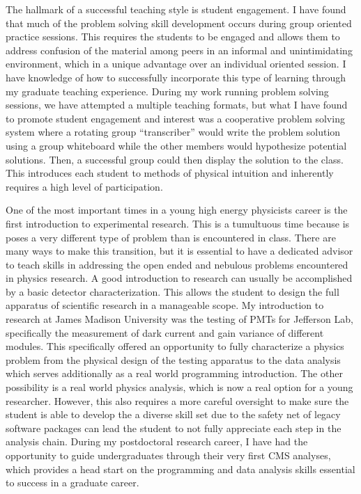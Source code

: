 \documentclass[12pt]{article}
\begin{document}
The hallmark of a successful teaching style is student engagement. I have found
that much of the problem solving skill development occurs during group oriented
practice sessions. This requires the students to be engaged and allows them to
address confusion of the material among peers in an informal and unintimidating
environment, which in a unique advantage over an individual oriented session. I
have knowledge of how to successfully incorporate this type of learning through
my graduate teaching experience. During my work running problem solving sessions,
we have attempted a multiple teaching formats, but what I have found to promote
student engagement and interest was a cooperative problem solving system where a
rotating group “transcriber” would write the problem solution using a group
whiteboard while the other members would hypothesize potential solutions. Then,
a successful group could then display the solution to the class. This introduces
each student to methods of physical intuition and inherently requires a high
level of participation.

One of the most important times in a young high energy physicists career is the
first introduction to experimental research. This is a tumultuous time because
is poses a very different type of problem than is encountered in class. There are
many ways to make this transition, but it is essential to have a dedicated
advisor to teach skills in addressing the open ended and nebulous problems
encountered in physics research. A good introduction to research can usually be
accomplished by a basic detector characterization. This allows the student to
design the full apparatus of scientific research in a manageable scope. My
introduction to research at James Madison University was the testing of PMTs for
Jefferson Lab, specifically the measurement of dark current and gain variance
of different modules. This specifically offered an opportunity to fully characterize
a physics problem from the physical design of the testing apparatus to the data
analysis which serves additionally as a real world programming introduction. The
other possibility is a real world physics analysis, which is now a real option
for a young researcher. However, this also requires a more careful oversight to
make sure the student is able to develop the a diverse skill set due to the safety
net of legacy software packages can lead the student to not fully appreciate each
step in the analysis chain. During my postdoctoral research career, I have had the
opportunity to guide undergraduates through their very first CMS analyses, which
provides a head start on the programming and data analysis skills essential to
success in a graduate career.
\end{document}
